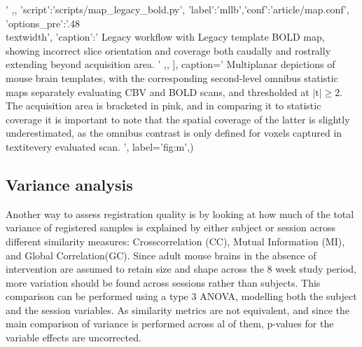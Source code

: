 {{                                '
			,},
		{'script':'scripts/map_legacy_bold.py', 'label':'mllb','conf':'article/map.conf', 'options_pre':'{.48\\textwidth}',
			'caption':'
				Legacy workflow with Legacy template BOLD map, showing incorrect slice orientation and coverage both caudally and rostrally extending beyond acquisition area.
			        '
                        ,},
		],
	caption='
                Multiplanar depictions of mouse brain templates, with the corresponding second-level omnibus statistic maps separately evaluating CBV and BOLD scans, and thresholded at $\mathrm{|t|\geq2}$.
                The acquisition area is bracketed in pink, and in comparing it to statistic coverage it is important to note that the spatial coverage of the latter is slightly underestimated, as the omnibus contrast is only defined for voxels captured in \\textit{every} evaluated scan.
                ',
	label='fig:m',)}

\subsection{Variance analysis}

\begin{sansmath}
\end{sansmath}

Another way to assess registration quality is by looking at how much of the total variance of registered samples is explained by either subject or session across different similarity measures:
Crosscorrelation (CC), Mutual Information (MI), and Global Correlation(GC).
Since adult mouse brains in the absence of intervention are assumed to retain size and shape across the 8 week study period, more variation should be found across sessions rather than subjects.
This comparison can be performed using a type 3 ANOVA, modelling both the subject and the session variables.
As similarity metrics are not equivalent, and since the main comparison of variance is performed across al of them, p-values for the variable effects are uncorrected.

